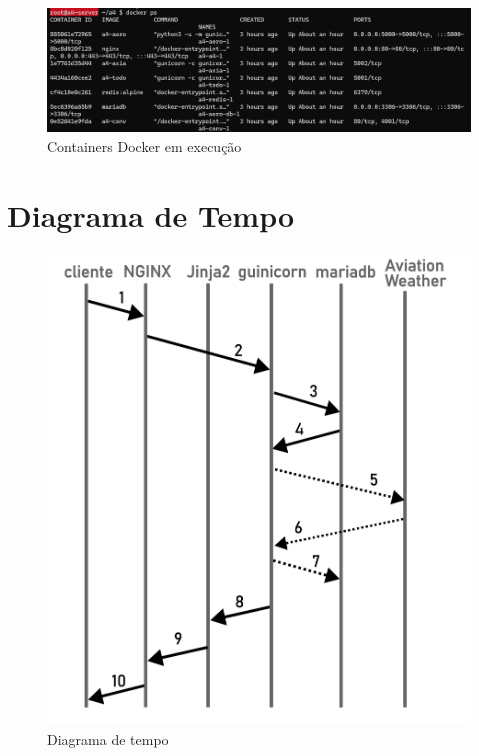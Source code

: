 \begin{figure}[ht]
    \begin{center}
    \includegraphics[width=400pt]{img/containers.png}
    \caption{Containers Docker em execução}
    \label{fig:containers}
    \end{center}
\end{figure}

\section{Diagrama de Tempo}

\begin{figure}[ht]
    \begin{center}
    \includegraphics[width=0.5\linewidth]{img/diagrama-tempo.png}
    \caption{Diagrama de tempo}
    \label{fig:tempo}
    \end{center}
\end{figure}

